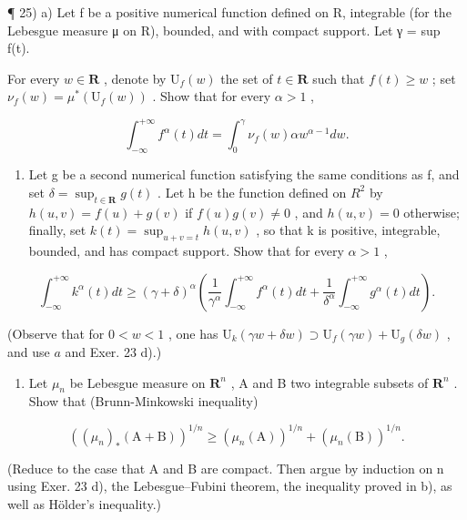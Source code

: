 ¶ 25) a) Let f be a positive numerical function defined on R, integrable (for the Lebesgue measure μ on R), bounded, and with compact support. Let γ = sup f(t).

For every \(w \in \mathbf{R}\) , denote by \(\mathrm{U}_f(w)\) the set of \(t \in \mathbf{R}\) such that \(f(t) \geqslant w\) ; set \(\nu_f(w) = \mu^*(\mathrm{U}_f(w))\) . Show that for every \(\alpha > 1\) ,

\[
\int_ {- \infty} ^ {+ \infty} f ^ {\alpha} (t) d t = \int_ {0} ^ {\gamma} \nu_ {f} (w) \alpha w ^ {\alpha - 1} d w.
\]

\begin{enumerate}
\def\labelenumi{\alph{enumi})}
\setcounter{enumi}{1}
\tightlist
\item
  Let g be a second numerical function satisfying the same conditions as f, and set \(\delta = \sup_{t \in \mathbf{R}} g(t)\) . Let h be the function defined on \(R^{2}\) by \(h(u,v) = f(u) + g(v)\) if \(f(u)g(v) \neq 0\) , and \(h(u,v) = 0\) otherwise; finally, set \(k(t) = \sup_{u+v=t} h(u,v)\) , so that k is positive, integrable, bounded, and has compact support. Show that for every \(\alpha > 1\) ,
\end{enumerate}

\[
\int_ {- \infty} ^ {+ \infty} k ^ {\alpha} (t) d t \geqslant (\gamma + \delta) ^ {\alpha} \left(\frac {1}{\gamma^ {\alpha}} \int_ {- \infty} ^ {+ \infty} f ^ {\alpha} (t) d t + \frac {1}{\delta^ {\alpha}} \int_ {- \infty} ^ {+ \infty} g ^ {\alpha} (t) d t\right).
\]

(Observe that for \(0 < w < 1\) , one has \(\mathrm{U}_k(\gamma w + \delta w) \supset \mathrm{U}_f(\gamma w) + \mathrm{U}_g(\delta w)\) , and use \(a\) and Exer. 23 d).)

\begin{enumerate}
\def\labelenumi{\alph{enumi})}
\setcounter{enumi}{2}
\tightlist
\item
  Let \(\mu_{n}\) be Lebesgue measure on \(\mathbf{R}^{n}\) , A and B two integrable subsets of \(\mathbf{R}^{n}\) . Show that (Brunn-Minkowski inequality)
\end{enumerate}

\[
\left(\left(\mu_ {n}\right) _ {*} (\mathrm{A} + \mathrm{B})\right) ^ {1 / n} \geqslant \left(\mu_ {n} (\mathrm{A})\right) ^ {1 / n} + \left(\mu_ {n} (\mathrm{B})\right) ^ {1 / n}.
\]

(Reduce to the case that A and B are compact. Then argue by induction on n using Exer. 23 d), the Lebesgue--Fubini theorem, the inequality proved in b), as well as Hölder's inequality.)

